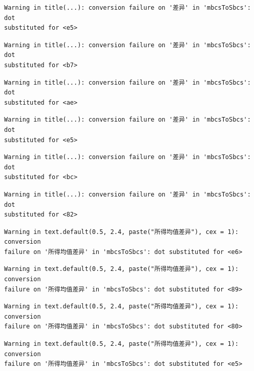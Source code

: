 \documentclass[
  letterpaper,
  DIV=11,
  numbers=noendperiod]{scrreprt}
\begin{document}
\begin{verbatim}
Warning in title(...): conversion failure on '差异' in 'mbcsToSbcs': dot
substituted for <e5>
\end{verbatim}

\begin{verbatim}
Warning in title(...): conversion failure on '差异' in 'mbcsToSbcs': dot
substituted for <b7>
\end{verbatim}

\begin{verbatim}
Warning in title(...): conversion failure on '差异' in 'mbcsToSbcs': dot
substituted for <ae>
\end{verbatim}

\begin{verbatim}
Warning in title(...): conversion failure on '差异' in 'mbcsToSbcs': dot
substituted for <e5>
\end{verbatim}

\begin{verbatim}
Warning in title(...): conversion failure on '差异' in 'mbcsToSbcs': dot
substituted for <bc>
\end{verbatim}

\begin{verbatim}
Warning in title(...): conversion failure on '差异' in 'mbcsToSbcs': dot
substituted for <82>
\end{verbatim}

\begin{verbatim}
Warning in text.default(0.5, 2.4, paste("所得均值差异"), cex = 1): conversion
failure on '所得均值差异' in 'mbcsToSbcs': dot substituted for <e6>
\end{verbatim}

\begin{verbatim}
Warning in text.default(0.5, 2.4, paste("所得均值差异"), cex = 1): conversion
failure on '所得均值差异' in 'mbcsToSbcs': dot substituted for <89>
\end{verbatim}

\begin{verbatim}
Warning in text.default(0.5, 2.4, paste("所得均值差异"), cex = 1): conversion
failure on '所得均值差异' in 'mbcsToSbcs': dot substituted for <80>
\end{verbatim}

\begin{verbatim}
Warning in text.default(0.5, 2.4, paste("所得均值差异"), cex = 1): conversion
failure on '所得均值差异' in 'mbcsToSbcs': dot substituted for <e5>
\end{verbatim}
\end{document}
